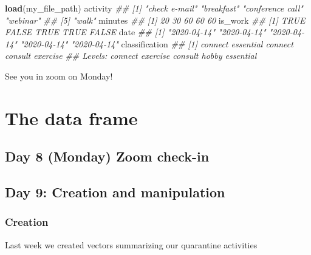 \documentclass[]{book}
\newenvironment{Shaded}{\begin{snugshade}}{\end{snugshade}}
\newcommand{\CommentTok}[1]{\textcolor[rgb]{0.56,0.35,0.01}{\textit{#1}}}
\newcommand{\KeywordTok}[1]{\textcolor[rgb]{0.13,0.29,0.53}{\textbf{#1}}}
\newcommand{\NormalTok}[1]{#1}
\begin{document}
\begin{itemize}
\begin{Shaded}
\begin{Highlighting}[]
\KeywordTok{load}\NormalTok{(my_file_path)}
\NormalTok{activity}
\CommentTok{## [1] "check e-mail"    "breakfast"       "conference call" "webinar"        }
\CommentTok{## [5] "walk"}
\NormalTok{minutes}
\CommentTok{## [1] 20 30 60 60 60}
\NormalTok{is_work}
\CommentTok{## [1]  TRUE FALSE  TRUE  TRUE FALSE}
\NormalTok{date}
\CommentTok{## [1] "2020-04-14" "2020-04-14" "2020-04-14" "2020-04-14" "2020-04-14"}
\NormalTok{classification}
\CommentTok{## [1] connect   essential connect   consult   exercise }
\CommentTok{## Levels: connect exercise consult hobby essential}
\end{Highlighting}
\end{Shaded}
\end{itemize}

See you in zoom on Monday!

\hypertarget{two}{%
\chapter{The data frame}\label{two}}

\hypertarget{day-8-monday-zoom-check-in}{%
\section{Day 8 (Monday) Zoom check-in}\label{day-8-monday-zoom-check-in}}

\hypertarget{day-9-creation-and-manipulation}{%
\section{Day 9: Creation and manipulation}\label{day-9-creation-and-manipulation}}

\hypertarget{creation}{%
\subsection*{Creation}\label{creation}}

Last week we created vectors summarizing our quarantine activities
\end{document}
